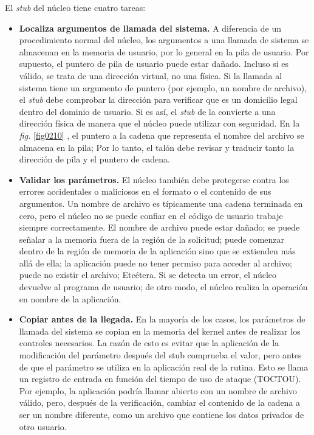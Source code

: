 \documentclass[10pt]{book}
\begin{document}
El \textit{stub} del núcleo tiene cuatro tareas:
\begin{itemize}
\item \textbf{Localiza argumentos de llamada del sistema.} A diferencia de un procedimiento normal del núcleo, los argumentos a una llamada de sistema se almacenan en la memoria de usuario, por lo general en la pila de usuario. Por supuesto, el puntero de pila de usuario puede estar dañado. Incluso si es válido, se trata de una dirección virtual, no una física. Si la llamada al sistema tiene un argumento de puntero (por ejemplo, un nombre de archivo), el \textit{stub} debe comprobar la dirección para verificar que es un domicilio legal dentro del dominio de usuario. Si es así, el \textit{stub} de la convierte a una dirección física de manera que el núcleo puede utilizar con seguridad. En la \textit{fig.} \ref{fig0210} , el puntero a la cadena que representa el nombre del archivo se almacena en la pila; Por lo tanto, el talón debe revisar y traducir tanto la dirección de pila y el
puntero de cadena.
\item \textbf{Validar los parámetros.} El núcleo también debe protegerse contra los errores accidentales o maliciosos en el formato o el contenido de sus argumentos. Un nombre de archivo es típicamente una cadena terminada en cero, pero el núcleo no se puede confiar en el código de usuario trabaje siempre correctamente. El nombre de archivo puede estar dañado; se puede señalar a la memoria fuera de la región de la solicitud; puede comenzar dentro de la región de memoria de la aplicación sino que se extienden más allá de ella; la aplicación puede no tener permiso para acceder al archivo; puede no existir el archivo; Etcétera. Si se detecta un error, el núcleo devuelve al programa de usuario; de otro modo, el núcleo realiza la operación en nombre de la aplicación.

\item \textbf{Copiar antes de la llegada.} En la mayoría de los casos, los parámetros de llamada del sistema se copian en la memoria del kernel antes de realizar los controles necesarios. La razón de esto es evitar que la aplicación de la modificación del parámetro después del stub comprueba el valor, pero antes de que el parámetro se utiliza en la aplicación real de la rutina. Esto se llama un registro de entrada en función del tiempo de uso de ataque (TOCTOU). Por ejemplo, la aplicación podría llamar abierto con un nombre de archivo válido, pero, después de la verificación, cambiar el contenido de la cadena a ser un nombre diferente, como un archivo que contiene los datos privados de otro usuario.


\end{itemize}
\end{document}
